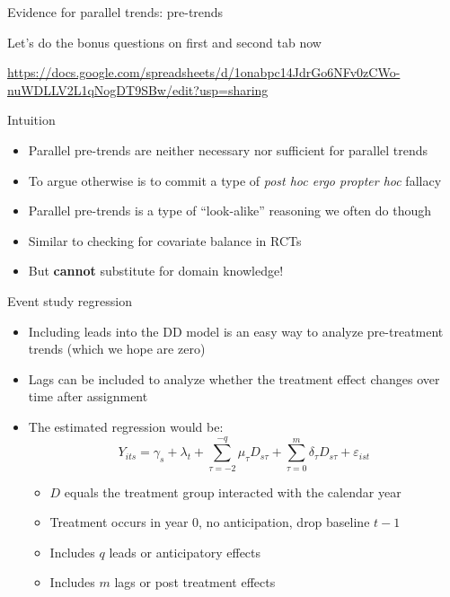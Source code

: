 \documentclass{beamer}
\begin{document}
\begin{frame}{Evidence for parallel trends: pre-trends}

Let's do the bonus questions on first and second tab now 

\url{https://docs.google.com/spreadsheets/d/1onabpc14JdrGo6NFv0zCWo-nuWDLLV2L1qNogDT9SBw/edit?usp=sharing}

\end{frame}

\begin{frame}{Intuition}

\begin{itemize}
\item Parallel pre-trends are neither necessary nor sufficient for parallel trends
\item To argue otherwise is to commit a type of \emph{post hoc ergo propter hoc} fallacy
\item Parallel pre-trends is a type of ``look-alike'' reasoning we often do though
\item Similar to checking for covariate balance in RCTs
\item But \textbf{cannot} substitute for domain knowledge!
\end{itemize}

\end{frame}



\begin{frame}{Event study regression}
	
	\begin{itemize}
	\item Including leads into the DD model is an easy way to analyze pre-treatment trends (which we hope are zero)
	\item Lags can be included to analyze whether the treatment effect changes over time after assignment
	\item The estimated regression would be:$$Y_{its} = \gamma_s + \lambda_t + \sum_{\tau=-2}^{-q}\mu_{\tau}D_{s\tau} + \sum_{\tau=0}^m\delta_{\tau}D_{s\tau}+\varepsilon_{ist}$$
		\begin{itemize}
		\item $D$ equals the treatment group interacted with the calendar year
		\item Treatment occurs in year 0, no anticipation, drop baseline $t-1$
		\item Includes $q$ leads or anticipatory effects
		\item Includes $m$ lags or post treatment effects
		\end{itemize}
	\end{itemize}
\end{frame}
\end{document}
